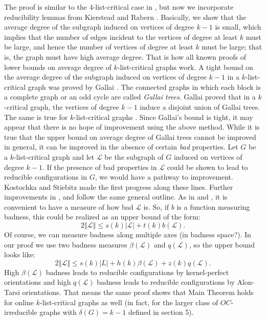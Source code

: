\documentclass[10pt]{article}
\theoremstyle{plain}
\theoremstyle{definition}
\theoremstyle{remark}
\newcommand{\fancy}[1]{\mathcal{#1}}
\renewcommand{\L}{\fancy{L}}
\newcommand{\card}[1]{\left|#1\right|}
\newcommand{\size}[1]{\left\Vert#1\right\Vert}
\begin{document}
The proof is similar to the $4$-list-critical case in \cite{Better4ListCriticalBound}, but now we incorporate reducibility lemmas from Kierstead and Rabern \cite{OreVizing}.  
Basically, we show that the average degree of the subgraph induced on vertices of degree $k-1$ is small, which implies that the number of edges incident to the vertices of degree at least $k$ must be large,
and hence the number of vertices of degree at least $k$ must be large; that is, the graph must have high average degree.  That is how all known proofs of lower bounds on average degree of $k$-list-critical graphs work.
A tight bound on the average degree of the subgraph induced on vertices of degree $k-1$ in a $k$-list-critical graph was proved by Gallai \cite{gallai1963kritische}.  The connected graphs in which each block is a complete graph
or an odd cycle are called \emph{Gallai trees}.  Gallai \cite{gallai1963kritische} proved that in a $k$-critical graph, the vertices of degree $k-1$ induce a disjoint union of Gallai trees.  
The same is true for $k$-list-critical graphs \cite{borodin1977criterion, erdos1979choosability}.  Since Gallai's bound is tight, it may appear that there is no hope of improvement using the above method.  
While it is true that the upper bound on average degree of Gallai trees cannot be improved in general, it can be improved in the absence of certain \emph{bad} properties.  
Let $G$ be a $k$-list-critical graph and let $\L$ be the subgraph of $G$ induced on vertices of degree $k-1$.
If the presence of bad properties in $\L$ could be shown to lead to reducible configurations in $G$, we would have a pathway to improvement.  Kostochka and Stiebitz \cite{kostochkastiebitzedgesincriticalgraph}
made the first progress along these lines.  Further improvements in \cite{OreVizing}, \cite{DischargingLowerBound} and \cite{Better4ListCriticalBound} follow the same general outline.  
As in \cite{DischargingLowerBound} and \cite{Better4ListCriticalBound}, it is convenient to have a measure of how bad $\L$ is.  So, if $b$ is a function measuring badness, this could be realized as
an upper bound of the form:
\[2\size{\L} \le s(k)\card{\L} + t(k)b(\L).\]
Of course, we can measure badness along multiple axes (in badness space?).  In our proof we use two badness measures $\beta(\L)$ and $q(\L)$, so the upper bound looks like:
\[2\size{\L} \le s(k)\card{L} + h(k)\beta(\L) + z(k)q(\L).\]
High $\beta(\L)$ badness leads to reducible configurations by kernel-perfect orientations and high $q(\L)$ badness leads to reducible configurations by Alon-Tarsi orientations.
That means the same proof shows that Main Theorem holds for online $k$-list-critical graphs as well (in fact, for the larger class of $OC$-irreducible graphs with $\delta(G) = k-1$ defined in section 5).
\end{document}
